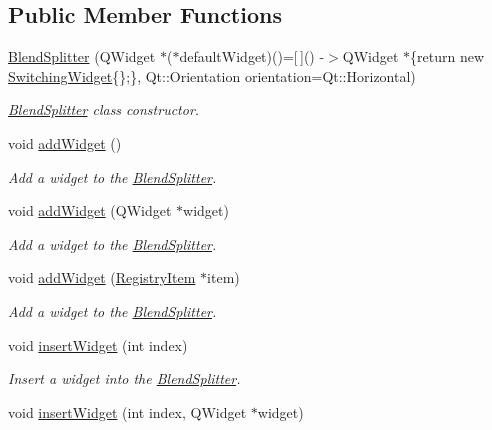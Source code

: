 \subsection*{Public Member Functions}
\begin{DoxyCompactItemize}
\item 
\hyperlink{class_blend_splitter_a8a305d92da45200aa9cc3e7160124cc3}{Blend\+Splitter} (Q\+Widget $\ast$($\ast$default\+Widget)()=\mbox{[}$\,$\mbox{]}() -\/$>$Q\+Widget $\ast$\{return new \hyperlink{class_switching_widget}{Switching\+Widget}\{\};\}, Qt\+::\+Orientation orientation=Qt\+::\+Horizontal)
\begin{DoxyCompactList}\small\item\em \hyperlink{class_blend_splitter}{Blend\+Splitter} class constructor. \end{DoxyCompactList}\item 
void \hyperlink{class_blend_splitter_a9bb010ba4ee756ca4d718acadaffb7cc}{add\+Widget} ()
\begin{DoxyCompactList}\small\item\em Add a widget to the \hyperlink{class_blend_splitter}{Blend\+Splitter}. \end{DoxyCompactList}\item 
void \hyperlink{class_blend_splitter_a305c3aee946a9fb9dcd95fdc72faff8b}{add\+Widget} (Q\+Widget $\ast$widget)
\begin{DoxyCompactList}\small\item\em Add a widget to the \hyperlink{class_blend_splitter}{Blend\+Splitter}. \end{DoxyCompactList}\item 
void \hyperlink{class_blend_splitter_a9ea589322d7bbb3e5530ad79df18a525}{add\+Widget} (\hyperlink{class_registry_item}{Registry\+Item} $\ast$item)
\begin{DoxyCompactList}\small\item\em Add a widget to the \hyperlink{class_blend_splitter}{Blend\+Splitter}. \end{DoxyCompactList}\item 
void \hyperlink{class_blend_splitter_ac26cdfb64fb785a1983a5b7527ce5189}{insert\+Widget} (int index)
\begin{DoxyCompactList}\small\item\em Insert a widget into the \hyperlink{class_blend_splitter}{Blend\+Splitter}. \end{DoxyCompactList}\item 
void \hyperlink{class_blend_splitter_a9c15101a7a0acb30f6cd46ff5259af79}{insert\+Widget} (int index, Q\+Widget $\ast$widget)

\end{DoxyCompactItemize}
